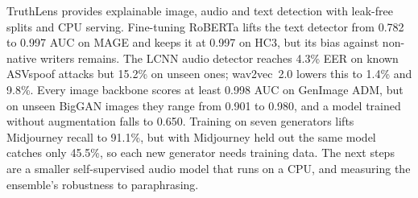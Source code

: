 \documentclass[conference]{IEEEtran}
\begin{document}
TruthLens provides explainable image, audio and text detection with leak-free splits and CPU serving. Fine-tuning RoBERTa lifts the text detector from 0.782 to 0.997 AUC on MAGE and keeps it at 0.997 on HC3, but its bias against non-native writers remains. The LCNN audio detector reaches 4.3\% EER on known ASVspoof attacks but 15.2\% on unseen ones; wav2vec~2.0 lowers this to 1.4\% and 9.8\%. Every image backbone scores at least 0.998 AUC on GenImage ADM, but on unseen BigGAN images they range from 0.901 to 0.980, and a model trained without augmentation falls to 0.650. Training on seven generators lifts Midjourney recall to 91.1\%, but with Midjourney held out the same model catches only 45.5\%, so each new generator needs training data. The next steps are a smaller self-supervised audio model that runs on a CPU, and measuring the ensemble's robustness to paraphrasing.



\end{document}
